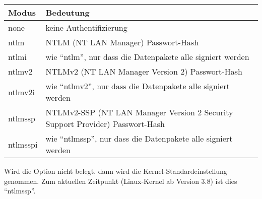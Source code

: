 \begin{description}
  \begin{tabular}{|p{1.5cm}|p{11.5cm}|}
    \hline
    Modus & Bedeutung \\
    \hline
    none & keine Authentifizierung \\
    ntlm & NTLM (NT LAN Manager) Passwort-Hash \\
    ntlmi & wie ``ntlm'', nur dass die Datenpakete alle signiert werden \\
    ntlmv2 & NTLMv2 (NT LAN Manager Version 2) Passwort-Hash \\
    ntlmv2i & wie ``ntlmv2'', nur dass die Datenpakete alle signiert werden \\
    ntlmssp & NTLMv2-SSP (NT LAN Manager Version 2 Security Support Provider) Passwort-Hash \\
    ntlmsspi & wie ``ntlmssp'', nur dass die Datenpakete alle signiert werden \\
    \hline
  \end{tabular}

  Wird die Option nicht belegt, dann wird die Kernel-Standardeinstellung
  genommen. Zum aktuellen Zeitpunkt (Linux-Kernel ab Version 3.8) ist dies
  ``ntlmssp''.


\end{description}
